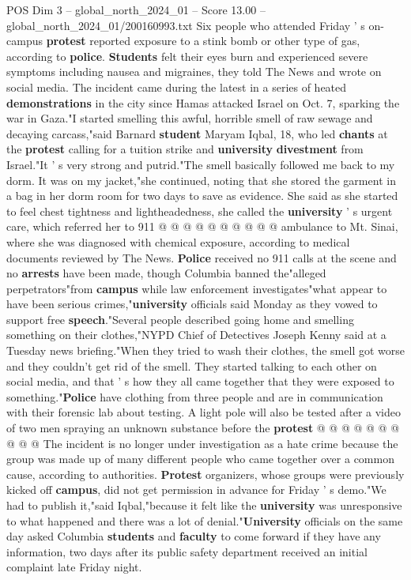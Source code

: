 \begin{textsample}{POS Dim 3 – global\_north\_2024\_01 – Score 13.00 – global\_north\_2024\_01/200160993.txt}  \label{ex:f3_pos_223}
Six people who attended Friday ' s on-campus \textbf{protest} reported exposure to a stink bomb or other type of gas, according to \textbf{police}. \textbf{Students} felt their eyes burn and experienced severe symptoms including nausea and migraines, they told The News and wrote on social media.
The incident came during the latest in a series of heated \textbf{demonstrations} in the city since Hamas attacked Israel on Oct. 7, sparking the war in Gaza."I started smelling this awful, horrible smell of raw sewage and decaying carcass,"said Barnard \textbf{student} Maryam Iqbal, 18, who led \textbf{chants} at the \textbf{protest} calling for a tuition strike and \textbf{university} \textbf{divestment} from Israel."It ' s very strong and putrid."The smell basically followed me back to my dorm.
It was on my jacket,"she continued, noting that she stored the garment in a bag in her dorm room for two days to save as evidence.
She said as she started to feel chest tightness and lightheadedness, she called the \textbf{university} ' s urgent care, which referred her to 911 @ @ @ @ @ @ @ @ @ @ ambulance to Mt.
Sinai, where she was diagnosed with chemical exposure, according to medical documents reviewed by The News. \textbf{Police} received no 911 calls at the scene and no \textbf{arrests} have been made, though Columbia banned the"alleged perpetrators"from \textbf{campus} while law enforcement investigates"what appear to have been serious crimes,"\textbf{university} officials said Monday as they vowed to support free \textbf{speech}."Several people described going home and smelling something on their clothes,"NYPD Chief of Detectives Joseph Kenny said at a Tuesday news briefing."When they tried to wash their clothes, the smell got worse and they couldn't get rid of the smell.
They started talking to each other on social media, and that ' s how they all came together that they were exposed to something."\textbf{Police} have clothing from three people and are in communication with their forensic lab about testing.
A light pole will also be tested after a video of two men spraying an unknown substance before the \textbf{protest} @ @ @ @ @ @ @ @ @ @ The incident is no longer under investigation as a hate crime because the group was made up of many different people who came together over a common cause, according to authorities. \textbf{Protest} organizers, whose groups were previously kicked off \textbf{campus}, did not get permission in advance for Friday ' s demo."We had to publish it,"said Iqbal,"because it felt like the \textbf{university} was unresponsive to what happened and there was a lot of denial."\textbf{University} officials on the same day asked Columbia \textbf{students} and \textbf{faculty} to come forward if they have any information, two days after its public safety department received an initial complaint late Friday night.

\end{textsample}
